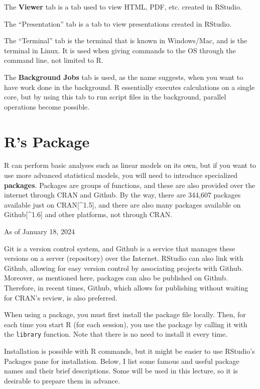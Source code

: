 \documentclass[
  a4paper,
]{book}
\begin{document}
The \textbf{Viewer} tab is a tab used to view HTML, PDF, etc. created in
RStudio.

The ``Presentation'' tab is a tab to view presentations created in
RStudio.

The ``Terminal'' tab is the terminal that is known in Windows/Mac, and
is the terminal in Linux. It is used when giving commands to the OS
through the command line, not limited to R.

The \textbf{Background Jobs} tab is used, as the name suggests, when you
want to have work done in the background. R essentially executes
calculations on a single core, but by using this tab to run script files
in the background, parallel operations become possible.

\section{R's Package}\label{rs-package}

R can perform basic analyses such as linear models on its own, but if
you want to use more advanced statistical models, you will need to
introduce specialized \textbf{packages}. Packages are groups of
functions, and these are also provided over the internet through CRAN
and Github. By the way, there are 344,607 packages available just on
CRAN{[}\^{}1.5{]}, and there are also many packages available on
Github{[}\^{}1.6{]} and other platforms, not through CRAN.

As of January 18, 2024

Git is a version control system, and Github is a service that manages
these versions on a server (repository) over the Internet. RStudio can
also link with Github, allowing for easy version control by associating
projects with Github. Moreover, as mentioned here, packages can also be
published on Github. Therefore, in recent times, Github, which allows
for publishing without waiting for CRAN's review, is also preferred.

When using a package, you must first install the package file locally.
Then, for each time you start R (for each session), you use the package
by calling it with the \texttt{library} function. Note that there is no
need to install it every time.

Installation is possible with R commands, but it might be easier to use
RStudio's Packages pane for installation. Below, I list some famous and
useful package names and their brief descriptions. Some will be used in
this lecture, so it is desirable to prepare them in advance.
\end{document}
